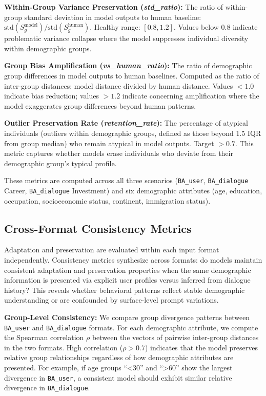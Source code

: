 \documentclass[final]{clv2025}
\newcommand{\paratitle}[1]{\smallskip\noindent\textbf{#1}}
\begin{document}
\paratitle{Within-Group Variance Preservation (\textit{std\_ratio}):}
The ratio of within-group standard deviation in model outputs to human baseline: $\text{std}(S_g^{\text{model}}) / \text{std}(S_g^{\text{human}})$. Healthy range: $[0.8, 1.2]$. Values below 0.8 indicate problematic variance collapse where the model suppresses individual diversity within demographic groups.


\paratitle{Group Bias Amplification (\textit{vs\_human\_ratio}):}
The ratio of demographic group differences in model outputs to human baselines. Computed as the ratio of inter-group distances: model distance divided by human distance. Values $< 1.0$ indicate bias reduction; values $> 1.2$ indicate concerning amplification where the model exaggerates group differences beyond human patterns.

\paratitle{Outlier Preservation Rate (\textit{retention\_rate}):}
The percentage of atypical individuals (outliers within demographic groups, defined as those beyond 1.5 IQR from group median) who remain atypical in model outputs. Target $> 0.7$. This metric captures whether models erase individuals who deviate from their demographic group's typical profile.

These metrics are computed across all three scenarios (\texttt{BA\_user}, \texttt{BA\_dialogue} Career, \texttt{BA\_dialogue} Investment) and six demographic attributes (age, education, occupation, socioeconomic status, continent, immigration status).

\subsection{Cross-Format Consistency Metrics}
\label{sec:consistency_distance}

Adaptation and preservation are evaluated within each input format independently. Consistency metrics synthesize across formats: do models maintain consistent adaptation and preservation properties when the same demographic information is presented via explicit user profiles versus inferred from dialogue history? This reveals whether behavioral patterns reflect stable demographic understanding or are confounded by surface-level prompt variations.

\paratitle{Group-Level Consistency:}
We compare group divergence patterns between \texttt{BA\_user} and \texttt{BA\_dialogue} formats. For each demographic attribute, we compute the Spearman correlation $\rho$ between the vectors of pairwise inter-group distances in the two formats. High correlation ($\rho > 0.7$) indicates that the model preserves relative group relationships regardless of how demographic attributes are presented. For example, if age groups ``<30'' and ``>60'' show the largest divergence in \texttt{BA\_user}, a consistent model should exhibit similar relative divergence in \texttt{BA\_dialogue}.
\end{document}
